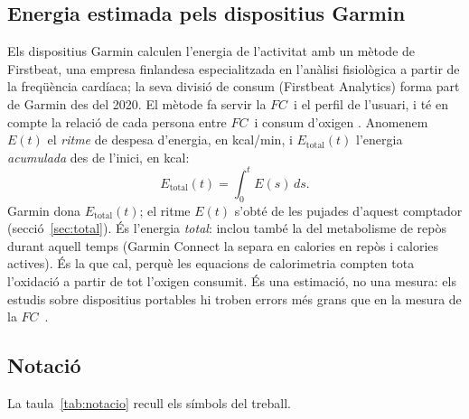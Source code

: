 \documentclass[10pt,a4paper]{article}
\newcommand{\sub}[1]{{\scriptscriptstyle\mathrm{#1}}}   %
\newcommand{\tot}{\sub{total}}
\newcommand{\FC}{\ensuremath{\mathit{FC}}}
\begin{document}
\subsection{Energia estimada pels dispositius Garmin}\label{sec:energia}
Els dispositius Garmin calculen l'energia de l'activitat amb un mètode de Firstbeat, una
empresa finlandesa especialitzada en l'anàlisi fisiològica a partir de la freqüència
cardíaca; la seva divisió de consum (Firstbeat Analytics) forma part de Garmin des del 2020. El mètode fa servir la \FC\ i el perfil de l'usuari, i té en compte la relació de cada persona entre
\FC\ i consum d'oxigen \citep{firstbeat2007}. Anomenem $E(t)$ el \emph{ritme} de despesa
d'energia, en kcal/min, i $E_{\tot}(t)$ l'energia \emph{acumulada} des de l'inici, en kcal:
\begin{equation}
  E_{\tot}(t)=\int_0^t E(s)\,ds .
  \label{eq:etotal}
\end{equation}
Garmin dona $E_{\tot}(t)$; el ritme $E(t)$ s'obté de les pujades d'aquest comptador
(secció~\ref{sec:total}). És l'energia \emph{total}: inclou també
la del metabolisme de repòs durant aquell temps (Garmin Connect la separa en calories en
repòs i calories actives). És la que cal, perquè les equacions de calorimetria compten tota
l'oxidació a partir de tot l'oxigen consumit. És una estimació, no una mesura: els estudis
sobre dispositius portables hi troben errors més grans que en la mesura de la \FC\
\citep{shcherbina2017,fuller2020}.

\needspace{10cm}
\subsection{Notació}
La taula~\ref{tab:notacio} recull els símbols del treball.
\end{document}
